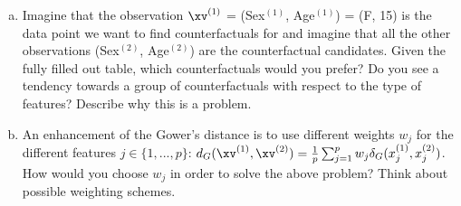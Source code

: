 {\begin{enumerate}[a)]
\item
Imagine that the observation $\xv^{(1)}$ = (Sex$^{(1)}$, Age$^{(1)}$) = (F, 15) is the data point we want to
find counterfactuals for and imagine that all the other observations (Sex$^{(2)}$, Age$^{(2)}$)
are the counterfactual candidates.
Given the fully filled out table, which counterfactuals would you prefer?
Do you see a tendency towards a group of counterfactuals with respect to the
type of features? Describe why this is a problem.

\item An enhancement of the Gower's distance is to use different weights $w_j$ for the
different features $j \in \{1, ..., p\}$:
$ d_G(\xv^{(1)}, \xv^{(2)}) =  \frac{1}{p}\sum_{j = 1}^{p} w_j \delta_G(x_j^{(1)}, x_j^{(2)})$.
How would you choose $w_j$ in order to solve the above problem?
Think about possible weighting schemes.

\end{enumerate}
}
